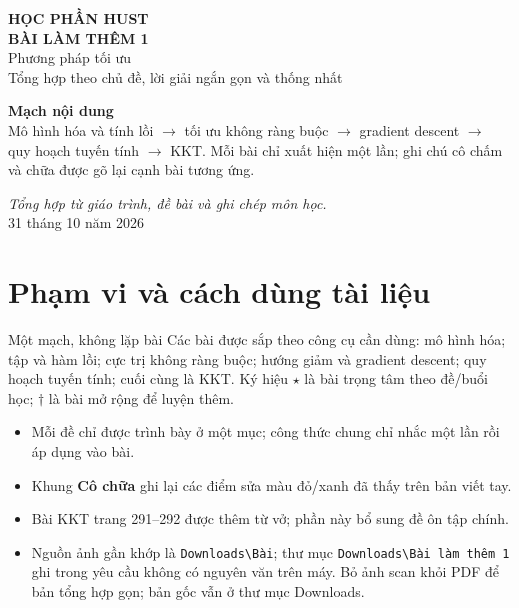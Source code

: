 \documentclass[11pt,a4paper]{article}
\begin{document}
\begin{titlepage}
\centering
\vspace*{2.1cm}
{\Large\color{teal}\textbf{HỌC PHẦN HUST}}\\[1.2cm]
{\Huge\color{navy}\textbf{BÀI LÀM THÊM 1}}\\[0.5cm]
{\LARGE Phương pháp tối ưu}\\[0.35cm]
{\large Tổng hợp theo chủ đề, lời giải ngắn gọn và thống nhất}\\[1.4cm]
\begin{tcolorbox}[width=.88\textwidth,colback=pale,colframe=navy,arc=2mm]
\centering
\textbf{Mạch nội dung}\\[4pt]
Mô hình hóa và tính lồi \(\to\) tối ưu không ràng buộc \(\to\) gradient descent \(\to\) quy hoạch tuyến tính \(\to\) KKT. Mỗi bài chỉ xuất hiện một lần; ghi chú cô chấm và chữa được gõ lại cạnh bài tương ứng.
\end{tcolorbox}
\vfill
\textit{Tổng hợp từ giáo trình, đề bài và ghi chép môn học.}\\[4pt]
31 tháng 10 năm 2026
\end{titlepage}

\renewcommand{\contentsname}{Mục lục}
\begingroup
\small
\setlength{\parskip}{0pt}
\tableofcontents
\endgroup
\clearpage

\section*{Phạm vi và cách dùng tài liệu}
\begin{keybox}{Một mạch, không lặp bài}
Các bài được sắp theo công cụ cần dùng: mô hình hóa; tập và hàm lồi; cực trị không ràng buộc; hướng giảm và gradient descent; quy hoạch tuyến tính; cuối cùng là KKT. Ký hiệu \(\star\) là bài trọng tâm theo đề/buổi học; \(\dagger\) là bài mở rộng để luyện thêm.
\end{keybox}
\begin{itemize}
\item Mỗi đề chỉ được trình bày ở một mục; công thức chung chỉ nhắc một lần rồi áp dụng vào bài.
\item Khung \textbf{Cô chữa} ghi lại các điểm sửa màu đỏ/xanh đã thấy trên bản viết tay.
\item Bài KKT trang 291--292 được thêm từ vở; phần này bổ sung đề ôn tập chính.
\item Nguồn ảnh gần khớp là \texttt{Downloads\textbackslash Bài}; thư mục \texttt{Downloads\textbackslash Bài làm thêm 1} ghi trong yêu cầu không có nguyên văn trên máy. Bỏ ảnh scan khỏi PDF để bản tổng hợp gọn; bản gốc vẫn ở thư mục Downloads.
\end{itemize}
\end{document}
